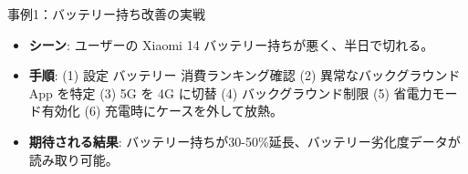 \begin{tcbinfo}{事例1：バッテリー持ち改善の実戦}
\begin{itemize}
  \item \textbf{シーン}: ユーザーの Xiaomi 14 バッテリー持ちが悪く、半日で切れる。
  \item \textbf{手順}: (1) 設定 バッテリー 消費ランキング確認 (2) 異常なバックグラウンド App を特定 (3) 5G を 4G に切替 (4) バックグラウンド制限 (5) 省電力モード有効化 (6) 充電時にケースを外して放熱。
  \item \textbf{期待される結果}: バッテリー持ちが30-50\%延長、バッテリー劣化度データが読み取り可能。
\end{itemize}

\end{tcbinfo}
